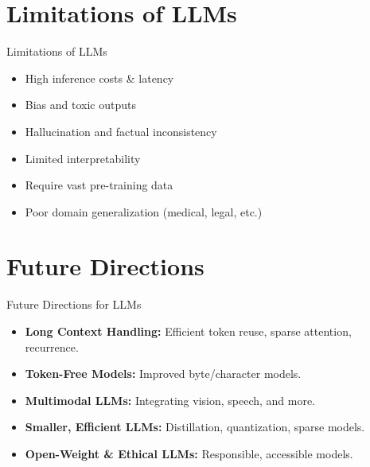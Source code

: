 \section{Limitations of LLMs}
\begin{frame}{Limitations of LLMs}
    \begin{itemize}
        \item High inference costs \& latency
        \item Bias and toxic outputs
        \item Hallucination and factual inconsistency
        \item Limited interpretability
        \item Require vast pre-training data
        \item Poor domain generalization (medical, legal, etc.)
    \end{itemize}
\end{frame}

\section{Future Directions}
\begin{frame}{Future Directions for LLMs}
    \begin{itemize}
        \item \textbf{Long Context Handling:} Efficient token reuse, sparse attention, recurrence.
        \item \textbf{Token-Free Models:} Improved byte/character models.
        \item \textbf{Multimodal LLMs:} Integrating vision, speech, and more.
        \item \textbf{Smaller, Efficient LLMs:} Distillation, quantization, sparse models.
        \item \textbf{Open-Weight \& Ethical LLMs:} Responsible, accessible models.
    \end{itemize}
\end{frame}